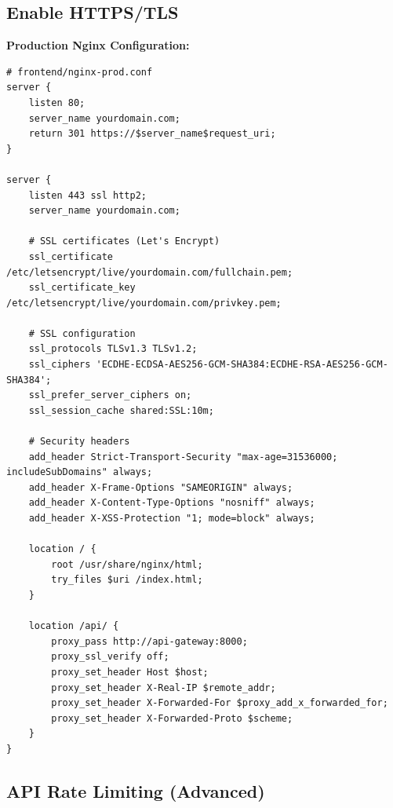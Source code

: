 \subsection{Enable HTTPS/TLS}

\textbf{Production Nginx Configuration:}
\begin{lstlisting}[style=pythonstyle]
# frontend/nginx-prod.conf
server {
    listen 80;
    server_name yourdomain.com;
    return 301 https://$server_name$request_uri;
}

server {
    listen 443 ssl http2;
    server_name yourdomain.com;
    
    # SSL certificates (Let's Encrypt)
    ssl_certificate /etc/letsencrypt/live/yourdomain.com/fullchain.pem;
    ssl_certificate_key /etc/letsencrypt/live/yourdomain.com/privkey.pem;
    
    # SSL configuration
    ssl_protocols TLSv1.3 TLSv1.2;
    ssl_ciphers 'ECDHE-ECDSA-AES256-GCM-SHA384:ECDHE-RSA-AES256-GCM-SHA384';
    ssl_prefer_server_ciphers on;
    ssl_session_cache shared:SSL:10m;
    
    # Security headers
    add_header Strict-Transport-Security "max-age=31536000; includeSubDomains" always;
    add_header X-Frame-Options "SAMEORIGIN" always;
    add_header X-Content-Type-Options "nosniff" always;
    add_header X-XSS-Protection "1; mode=block" always;
    
    location / {
        root /usr/share/nginx/html;
        try_files $uri /index.html;
    }
    
    location /api/ {
        proxy_pass http://api-gateway:8000;
        proxy_ssl_verify off;
        proxy_set_header Host $host;
        proxy_set_header X-Real-IP $remote_addr;
        proxy_set_header X-Forwarded-For $proxy_add_x_forwarded_for;
        proxy_set_header X-Forwarded-Proto $scheme;
    }
}
\end{lstlisting}

\subsection{API Rate Limiting (Advanced)}

